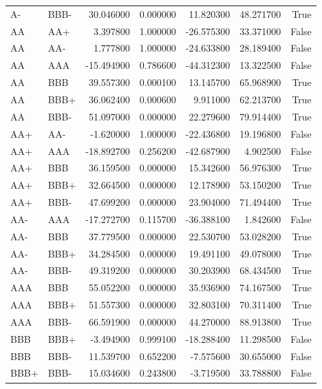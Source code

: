 \begin{tabular}{llrrrrr}
A- & BBB- & 30.046000 & 0.000000 & 11.820300 & 48.271700 & True \\
AA & AA+ & 3.397800 & 1.000000 & -26.575300 & 33.371000 & False \\
AA & AA- & 1.777800 & 1.000000 & -24.633800 & 28.189400 & False \\
AA & AAA & -15.494900 & 0.786600 & -44.312300 & 13.322500 & False \\
AA & BBB & 39.557300 & 0.000100 & 13.145700 & 65.968900 & True \\
AA & BBB+ & 36.062400 & 0.000600 & 9.911000 & 62.213700 & True \\
AA & BBB- & 51.097000 & 0.000000 & 22.279600 & 79.914400 & True \\
AA+ & AA- & -1.620000 & 1.000000 & -22.436800 & 19.196800 & False \\
AA+ & AAA & -18.892700 & 0.256200 & -42.687900 & 4.902500 & False \\
AA+ & BBB & 36.159500 & 0.000000 & 15.342600 & 56.976300 & True \\
AA+ & BBB+ & 32.664500 & 0.000000 & 12.178900 & 53.150200 & True \\
AA+ & BBB- & 47.699200 & 0.000000 & 23.904000 & 71.494400 & True \\
AA- & AAA & -17.272700 & 0.115700 & -36.388100 & 1.842600 & False \\
AA- & BBB & 37.779500 & 0.000000 & 22.530700 & 53.028200 & True \\
AA- & BBB+ & 34.284500 & 0.000000 & 19.491100 & 49.078000 & True \\
AA- & BBB- & 49.319200 & 0.000000 & 30.203900 & 68.434500 & True \\
AAA & BBB & 55.052200 & 0.000000 & 35.936900 & 74.167500 & True \\
AAA & BBB+ & 51.557300 & 0.000000 & 32.803100 & 70.311400 & True \\
AAA & BBB- & 66.591900 & 0.000000 & 44.270000 & 88.913800 & True \\
BBB & BBB+ & -3.494900 & 0.999100 & -18.288400 & 11.298500 & False \\
BBB & BBB- & 11.539700 & 0.652200 & -7.575600 & 30.655000 & False \\
BBB+ & BBB- & 15.034600 & 0.243800 & -3.719500 & 33.788800 & False \\
\bottomrule
\end{tabular}

